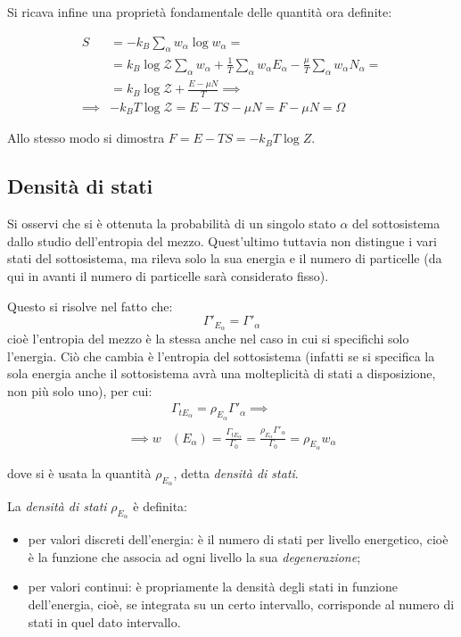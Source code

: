Si ricava infine una proprietà fondamentale delle quantità ora definite:

\begin{align*}
S &= - k_B \sum_{\alpha} w_\alpha \log w_\alpha =\\
&= k_B \log \mathcal{Z} \sum_{\alpha} w_\alpha + \frac{1}{T} \sum_{\alpha} w_\alpha E_\alpha - \frac{\mu}{T} \sum_{\alpha} w_\alpha N_\alpha =\\
&= k_B \log \mathcal{Z} + \frac{E - \mu N}{T} \implies\\
\implies & - k_B T \log \mathcal{Z} = E - T S - \mu N = F - \mu N = \Omega
\end{align*}

Allo stesso modo si dimostra $F = E - T S = - k_B T \log Z$.

\subsection{Densità di stati}
\label{sec:stdens}

Si osservi che si è ottenuta la probabilità di un singolo stato $\alpha$ del sottosistema dallo studio dell'entropia del mezzo. Quest'ultimo tuttavia non distingue i vari stati del sottosistema, ma rileva solo la sua energia e il numero di particelle (da qui in avanti il numero di particelle sarà considerato fisso).

Questo si risolve nel fatto che:
\begin{equation*}
\Gamma'_{E_\alpha} = \Gamma'_\alpha
\end{equation*}
\noindent cioè l'entropia del mezzo è la stessa anche nel caso in cui si specifichi solo l'energia. Ciò che cambia è l'entropia del sottosistema (infatti se si specifica la sola energia anche il sottosistema avrà una molteplicità di stati a disposizione, non più solo uno), per cui:
\begin{align*}
&\Gamma_{tE_\alpha} = \rho_{E_\alpha} \Gamma'_\alpha \implies \\
\implies w&(E_\alpha) = \frac{\Gamma_{tE_\alpha}}{\Gamma_0} = \frac{\rho_{E_\alpha} \Gamma'_\alpha}{\Gamma_0} = \rho_{E_\alpha} w_\alpha
\end{align*}

\noindent dove si è usata la quantità $\rho_{E_\alpha}$, detta \textit{densità di stati}.

\begin{defn}
	\label{def:statdens}
	La \textit{densità di stati} $\rho_{E_\alpha}$ è definita:
	\begin{itemize}
		\item per valori discreti dell'energia: è il numero di stati per livello energetico, cioè è la funzione che associa ad ogni livello la sua \textit{degenerazione};
		\item per valori continui: è propriamente la densità degli stati in funzione dell'energia, cioè, se integrata su un certo intervallo, corrisponde al numero di stati in quel dato intervallo.
	\end{itemize}
\end{defn}

